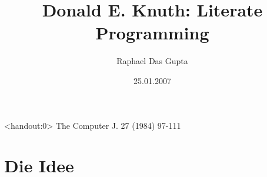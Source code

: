 \documentclass[10pt]{beamer}
\title{Donald E. Knuth: Literate Programming}
\author[R. Das Gupta]{Raphael Das Gupta}
\institute{ETH Zürich}
\date{25.01.2007}
\begin{document}
\begin{frame}<handout:0>  %
	The Computer J. 27 (1984) 97-111
	\titlepage
\end{frame}

\section{Die Idee}

\begin{comment}
\begin{frame}
	\frametitle{Programme als literarische Werke}\pause
	\begin{block}{``Was soll das nun heissen?''}
	\end{block}
\end{frame}

\subsection{Vorraussetzungen}

\begin{frame}
	\frametitle{Vorraussetzungen}
	\begin{itemize}
		\item Strukturierte Programme\pause
		\item Bedürfnis nach besserer Dokumentation
	\end{itemize}
\end{frame}

\subsection{Ziel}
\end{comment}
\end{document}
